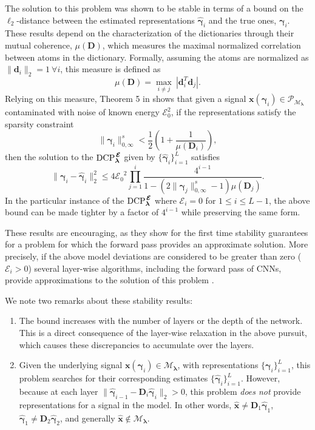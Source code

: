 \documentclass[10pt,journal]{IEEEtran}
\def\x{{\mathbf x}}
\def\d{{\mathbf d}}
\def\D{{\mathbf D}}
\def\M{{\mathcal{M}}}
\def\P{{\mathcal{P}}}
\def\gama{{\boldsymbol \gamma}}
\def\lamda{{\boldsymbol \lambda}}
\def\vps{{\bm{\mathbf{\mathcal{E}}}}}
\def\DCPE{{\text{DCP}_\lamda^{\hspace{0.04cm} \vps}}}
\def\PM{{\P_{\M_\lamda}}}
\theoremstyle{plain}
\theoremstyle{definition}
\begin{document}
{
The solution to this problem was shown to be stable in terms of a bound on the $\ell_2$-distance between the estimated representations $\hat{\gama}_i$ and the true ones, $\gama_i$. These results depend on the characterization of the dictionaries through their mutual coherence, $\mu(\D)$, which measures the maximal normalized correlation between atoms in the dictionary. Formally, assuming the atoms are normalized as $\|\d_i\|_2 = 1\ \forall i$, this measure is defined as 
\begin{equation}
	\mu(\D) = \underset{i\neq j}{\max}\ | \d_i^T\d_j|.
\end{equation}
Relying on this measure, Theorem 5 in \cite{Papyan2016convolutional} shows that given a signal $\x(\gama_i)\in\PM$ contaminated with noise of known energy $\mathcal{E}^2_0$, if the representations satisfy the sparsity constraint
\begin{equation}
	\| \gama_i \|^s_{0,\infty} < \frac{1}{2} \left( 1 + \frac{1}{\mu(\D_i)} \right),
\end{equation}
then the solution to the $\DCPE$ given by $\{\hat{\gama}_i\}_{i=1}^L$ satisfies
\begin{equation}
	\| \gama_i- \hat{\gama}_i \|_2^2 \leq 4 {\mathcal{E}_0}^2 \prod_{j=1}^{i} \frac{4^{i-1}}{1-(2\|\gama_j\|^s_{0,\infty}-1)\mu(\D_j)}.
\end{equation}
\noindent
In the particular instance of the $\DCPE$ where $\mathcal{E}_i = 0$ for $1\leq i \leq L-1$, the above bound can be made tighter by a factor of $4^{i-1}$ while preserving the same form.

These results are encouraging, as they show for the first time stability guarantees for a problem for which the forward pass provides an approximate solution. More precisely, if the above model deviations are considered to be greater than zero ($\mathcal{E}_i > 0$) several layer-wise algorithms, including the forward pass of CNNs, provide approximations to the solution of this problem \cite{Papyan2016convolutional}. }
We note two remarks about these stability results:
\begin{enumerate}
	\item The bound increases with the number of layers or the depth of the network. This is a direct consequence of the layer-wise relaxation in the above pursuit, which causes these discrepancies to accumulate over the layers.

	\item Given the underlying signal $\x(\gama_i) \in \M_{\lamda}$, with representations $\{\gama_i\}_{i=1}^L$, this problem searches for their corresponding estimates $\{\hat{\gama}_i\}_{i=1}^L$. However, because at each layer $\| \hat{\gama}_{i-1} - \D_i \hat{\gama}_i \|_2 > 0$, this problem \emph{does not} provide representations for a signal in the model. In other words, $\hat{\x} \neq \D_1 \hat{\gama}_1$, $\hat{\gama}_1 \neq \D_2 \hat{\gama}_2$, and generally $\hat{\x} \notin \M_{\lamda}$.
\end{enumerate}
\end{document}
